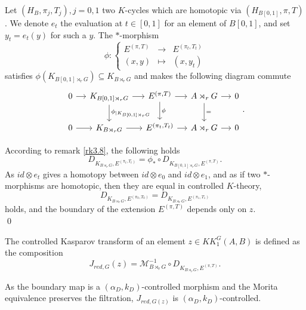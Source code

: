 \begin{dem}
Let $(H_B, \pi_j,T_j), j=0,1$ two $K$-cycles which are homotopic via $(H_{B[0,1]},\pi,T)$. We denote $e_t$ the evaluation at $t\in[0,1]$ for an element of $B[0,1]$, and set $y_t=e_t(y)$ for such a $y$. The $*$-morphism
\[\phi : \left\{\begin{array}{lll}E^{(\pi,T)} & \rightarrow & E^{(\pi_t,T_t)} \\ (x,y) & \mapsto & (x, y_t)\end{array}\right.\]
satisfies $\phi(K_{B[0,1] \rtimes_r G})\subseteq K_{B \rtimes_r G}$ and makes the following diagram commute
\[\begin{tikzcd}[column sep = small]
0\arrow{r} & K_{B[0,1] \rtimes_r G}\arrow{r}\arrow{d}{\phi_{|K_{B[0,1] \rtimes_r G}}} & E^{(\pi,T)} \arrow{r}\arrow{d}{\phi} & A\rtimes_r G \arrow{r}\arrow{d}{=}& 0 \\
0\arrow{r} & K_{B \rtimes_r G}\arrow{r} &  E^{(\pi_t,T_t)} \arrow{r} & A\rtimes_r G \arrow{r} & 0
\end{tikzcd}.\]

According to remark \ref{rk3.8}, the following holds
\[D_{K_{B\rtimes_r G},E^{(\pi_t,T_t)}} = \phi_* \circ D_{K_{B[0,1]\rtimes_r G},E^{(\pi,T)}}.\]
As $id \otimes e_t$ gives a homotopy between $id\otimes e_0$ and $id\otimes e_1$, and as if two $*$-morphisms are homotopic, then they are equal in controlled $K$-theory, 
\[D_{K_{B\rtimes_r G}, E^{(\pi_0,T_0)}}=D_{K_{B\rtimes_r G}, E^{(\pi_1,T_1)}}\]
holds, and the boundary of the extension $E^{(\pi,T)}$ depends only on $z$.\\
\qed
\end{dem}

\begin{definition}
The controlled Kasparov transform of an element $z\in KK_1^G(A,B)$ is defined as the composition
\[J_{red,G}(z)=\mathcal M_{B\rtimes_r G}^{-1}\circ D_{K_{B\rtimes_r G}, E^{(\pi,T)}}.\]
\end{definition}

As the boundary map is a $(\alpha_D,k_D)$-controlled morphism and the Morita equivalence preserves the filtration, $J_{red,G(z)}$ is  $(\alpha_D,k_D)$-controlled. 

